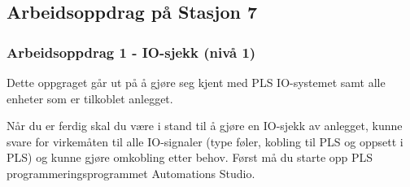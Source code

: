 \subsection*{Arbeidsoppdrag på Stasjon 7}

\subsubsection*{Arbeidsoppdrag 1 - IO-sjekk (nivå 1)}

Dette oppgraget går ut på å gjøre seg kjent med PLS IO-systemet samt
alle enheter som er tilkoblet anlegget. 

Når du er ferdig skal du være i stand til å gjøre en IO-sjekk av anlegget, kunne svare for virkemåten til alle IO-signaler (type føler, kobling til PLS og oppsett i PLS) og kunne gjøre omkobling etter behov.
Først må du starte opp PLS programmeringsprogrammet Automations Studio. 
